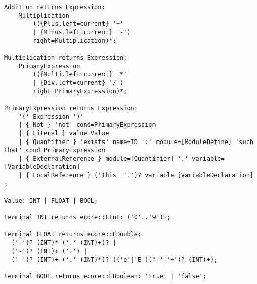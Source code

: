 \begin{lstlisting}[language=xtext,style=eclipse,caption={Sintassi di \acs{lapsa} in \xtext{}},label=code:lapsa:syntax]
Addition returns Expression:
	Multiplication 
		(({Plus.left=current} '+' 
		| {Minus.left=current} '-') 
		right=Multiplication)*;

Multiplication returns Expression:
	PrimaryExpression 
		(({Multi.left=current} '*' 
		| {Div.left=current} '/') 
		right=PrimaryExpression)*;

PrimaryExpression returns Expression:
	'(' Expression ')'
	| { Not } 'not' cond=PrimaryExpression
	| { Literal } value=Value
	| { Quantifier } 'exists' name=ID ':' module=[ModuleDefine] 'such that' cond=PrimaryExpression
	| { ExternalReference } module=[Quantifier] '.' variable=[VariableDeclaration] 
	| { LocalReference } ('this' '.')? variable=[VariableDeclaration]   
;

Value: INT | FLOAT | BOOL;

terminal INT returns ecore::EInt: ('0'..'9')+;

terminal FLOAT returns ecore::EDouble:
  ('-')? (INT)* ('.' (INT)+)? |
  ('-')? (INT)+ ('.') | 
  ('-')? (INT)+ ('.' (INT)*)? (('e'|'E')('-'|'+')? (INT)+);

terminal BOOL returns ecore::EBoolean: 'true' | 'false';
\end{lstlisting}

\vspace{0.4cm}